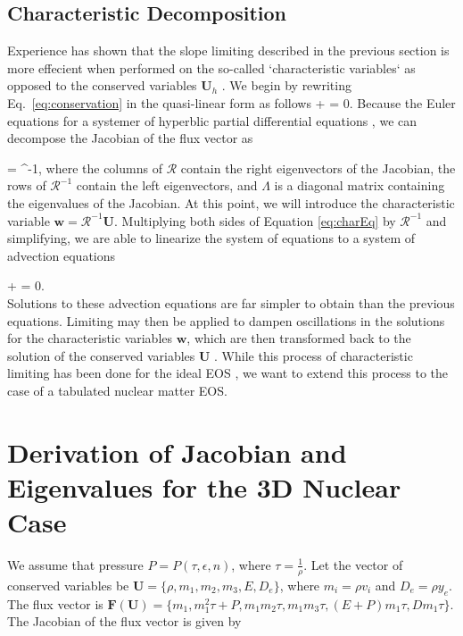 \documentclass[onecolumn]{aastex62}
\begin{document}
\subsection{Characteristic Decomposition}
\label{sec:characteristicDecomp}
Experience has shown that the slope limiting described in the previous section
is more effecient when performed on the so-called `characteristic variables`
as opposed to the conserved variables $\mathbf{U}_h$
\citep[see, e.g.,][for a description]{cockburn:1998}. We begin by
rewriting Eq.~\eqref{eq:conservation} in the quasi-linear form as follows
\beq
  +  
  = 0.
  \label{eq:charEq}
\eeq
Because the Euler equations for a systemer of hyperblic
partial differential equations \citep[see, e.g.,][]{leveque:1992}, we can decompose the
Jacobian of the flux vector as

\beq
   =
   \Lambda {}^{-1},
\eeq
where the columns of $\mathcal{R}$ contain the right eigenvectors of the Jacobian,
the rows of $\mathcal{R}^{-1}$ contain the left eigenvectors, and
$\Lambda$ is a diagonal matrix containing the eigenvalues of the Jacobian.
At this point, we will introduce the characteristic variable
$\mathbf{w} = \mathcal{R}^{-1}\mathbf{U}$. Multiplying both sides of Equation
\eqref{eq:charEq} by $\mathcal{R}^{-1}$ and simplifying, we are able to linearize the system of equations to
a system of advection equations

\beq
   +
  \Lambda {}
  = 0. \\
\eeq
Solutions to these advection equations are far simpler to obtain than the
previous equations. Limiting may then be applied to dampen oscillations in the
solutions for the characteristic variables $\mathbf{w}$, which are then
transformed back to the solution of the conserved variables $\mathbf{U}$
\citep[see e.g.,][for a description]{cockburn:1998, schaal:2015a}. While this
process of characteristic limiting has been done for the ideal EOS
\citep[][]{cockburn:1998}, we want to extend this process to the case of a
tabulated nuclear matter EOS.


\section{Derivation of Jacobian and Eigenvalues for the 3D Nuclear Case}
\label{sec:eigen}

We assume that pressure $P = P(\tau, \epsilon, n)$, where $\tau = \frac{1}{\rho}$.
Let the vector of conserved variables be $\textbf{U} = \{\rho, m_1, m_2, m_3, E, D_{e}\}$,
where $m_i = \rho v_i$ and $D_{e} = \rho y_{e}$.
The flux vector is $\textbf{F}(\textbf{U}) =
\{m_{1}, m_{1}^{2}\tau + P, m_{1}m_{2}\tau, m_{1}m_{3}\tau,
(E+P)m_{1}\tau, Dm_{1}\tau\}$. The Jacobian of the flux vector is given by
\end{document}
